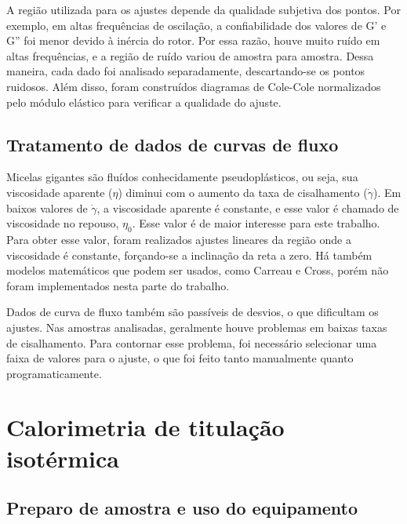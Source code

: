 		A região utilizada para os ajustes depende da qualidade subjetiva dos pontos. Por exemplo, em altas frequências de oscilação, a confiabilidade dos valores de G' e G'' foi menor devido à inércia do rotor. Por essa razão, houve muito ruído em altas frequências, e a região de ruído variou de amostra para amostra. Dessa maneira, cada dado foi analisado separadamente, descartando-se os pontos ruidosos. Além disso, foram construídos diagramas de Cole-Cole normalizados pelo módulo elástico para verificar a qualidade do ajuste.
				
		\section{Tratamento de dados de curvas de fluxo} 
		
		Micelas gigantes são fluídos conhecidamente pseudoplásticos, ou seja, sua viscosidade aparente (\(\eta\)) diminui com o aumento da taxa de cisalhamento (\(\dot{\gamma}\)). Em baixos valores de \(\dot{\gamma}\), a viscosidade aparente é constante, e esse valor é chamado de viscosidade no repouso, \(\eta_0\). Esse valor é de maior interesse para este trabalho. Para obter esse valor, foram realizados ajustes lineares da região onde a viscosidade é constante, forçando-se a inclinação da reta a zero. Há também modelos matemáticos que podem ser usados, como Carreau e Cross, porém não foram implementados nesta parte do trabalho.
		
		Dados de curva de fluxo também são passíveis de desvios, o que dificultam os ajustes. Nas amostras analisadas, geralmente houve problemas em baixas taxas de cisalhamento. Para contornar esse problema, foi necessário selecionar uma faixa de valores para o ajuste, o que foi feito tanto manualmente quanto programaticamente.
		
	\chapter{Calorimetria de titulação isotérmica} 
		\section{Preparo de amostra e uso do equipamento} 
		\label{sec:preparo_amostra_itc}
		
